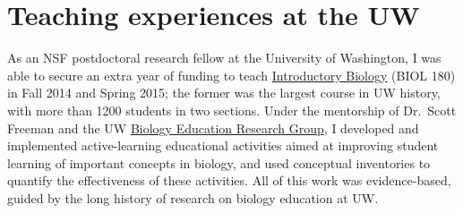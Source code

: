 
\section*{Teaching experiences at the UW}
As an NSF postdoctoral research fellow at the University of Washington,
I was able to secure an extra year of funding to teach
\href{http://courses.biology.washington.edu/biol180/}{Introductory Biology}
(BIOL 180) in Fall 2014 and Spring 2015;
the former was the largest course in UW history, with more than 1200 students
in two sections.
Under the mentorship of Dr.\ Scott Freeman and the UW
\href{https://sites.google.com/site/uwbioedresgroup/home}{Biology Education
    Research Group}, I developed and implemented active-learning
educational activities aimed at improving student learning of important
concepts in biology,
and used conceptual inventories to quantify the effectiveness of these
activities.
All of this work was evidence-based, guided by the long history of research on
biology education at UW.

